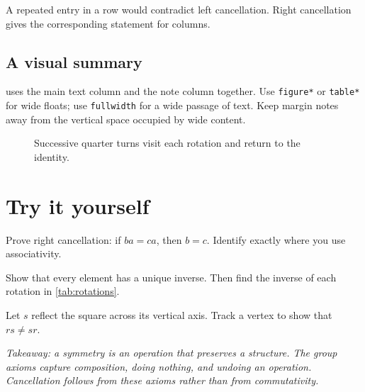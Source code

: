 \documentclass[10pt,a4paper,oneside]{scrartcl}
\begin{document}
\begin{remark}
A repeated entry in a row would contradict left cancellation.
Right cancellation gives the corresponding statement for columns.
\end{remark}

\subsection{A visual summary}
 uses the main text column and the note column together.
Use \texttt{figure*} or \texttt{table*} for wide floats; use
\texttt{fullwidth} for a wide passage of text. Keep margin notes away
from the vertical space occupied by wide content.

\begin{figure}[htbp]
\centering
{}
\caption{Successive quarter turns visit each rotation and return to the identity.}
\label{fig:cycle}
\end{figure}

\section{Try it yourself}
\begin{exercise}\label{ex:right}
Prove right cancellation: if $ba=ca$, then $b=c$.
Identify exactly where you use associativity.
\end{exercise}

\begin{exercise}
Show that every element has a unique inverse. Then find the inverse
of each rotation in \cref{tab:rotations}.
\end{exercise}

\begin{exercise}
Let $s$ reflect the square across its vertical axis. Track a vertex to
show that $rs\ne sr$.
\end{exercise}

\begin{fullwidth}
\small\itshape
Takeaway: a symmetry is an operation that preserves a structure.
The group axioms capture composition, doing nothing, and undoing an
operation. Cancellation follows from these axioms rather than from
commutativity.
\end{fullwidth}

\printbibliography[heading=bibintoc,title={Further reading}]
\end{document}
